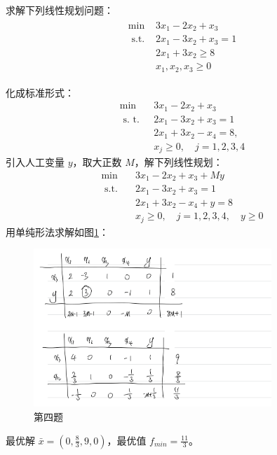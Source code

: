 \begin{problem}
    求解下列线性规划问题：
    \begin{align*}
        \begin{array}{ll}
            \min & 3 x_{1}-2 x_{2}+x_{3} \\
            \text { s.t. } & 2 x_{1}-3 x_{2}+x_{3}=1 \\
            & 2 x_{1}+3 x_{2} \geqslant 8 \\
            & x_{1}, x_{2}, x_{3} \geqslant 0 
        \end{array}
    \end{align*}
\end{problem}
\begin{solution}
    化成标准形式：
    \begin{align*}
        \min\quad & 3 x_{1}-2 x_{2}+x_{3}  \\
        \text { s. t. } & 2 x_{1}-3 x_{2}+x_{3}  =1 \\
        &2 x_{1}+3 x_{2}  -x_{4}=8, \\
        &x_{j} \geqslant 0, \quad j=1,2,3,4 
    \end{align*}
    引入人工变量 $y$，取大正数 $M$，解下列线性规划：
    \begin{align*}
        \min\quad & 3 x_{1}-2 x_{2}+x_{3}+M y\\
        \text { s.t. }& 2 x_{1}-3 x_{2}+x_{3} =1\\
        &2 x_{1}+3 x_{2}-x_{4}+y=8\\
        &x_{j} \geqslant 0, \quad j=1,2,3,4, \quad y \geqslant 0 
    \end{align*}
    用单纯形法求解如图\ref{fig4}：
    \begin{figure}[htbp]
        \centering
        \includegraphics[width=0.8\textwidth]{./figures/img4.png}
        \caption{第四题 \label{fig4}}
    \end{figure}
    最优解 $\bar{x} = \left(0, \frac{8}{3}, 9, 0\right)$，最优值 $f_{min} = \frac{11}{3}$。
\end{solution}

